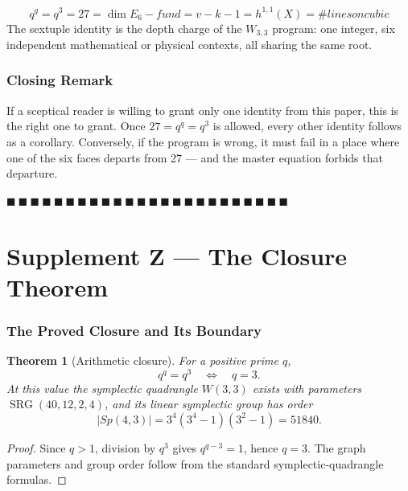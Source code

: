 \documentclass[12pt,a4paper]{article}
\def\mathrm#1{#1}%
\def\text#1{#1}%
\newtheorem{theorem}{Theorem}[section]
\theoremstyle{definition}
\newcommand{\Sp}{\mathrm{Sp}}
\begin{document}
\[
\boxed{\;q^q = q^3 = 27 = \dim E_6\text{-fund} = v - k - 1 = h^{1,1}(X) = \#\text{lines on cubic}\;}
\]
The sextuple identity is the depth charge of the $W_{3,3}$ program:
one integer, six independent mathematical or physical contexts, all
sharing the same root.

\section*{Closing Remark}

If a sceptical reader is willing to grant only one identity from this
paper, this is the right one to grant. Once $27 = q^q = q^3$ is
allowed, every other identity follows as a corollary. Conversely,
if the program is wrong, it must fail in a place where one of the
six faces departs from 27 — and the master equation forbids that
departure.

\hfill $\blacksquare\ \blacksquare\ \blacksquare\ \blacksquare\ \blacksquare\ \blacksquare\ \blacksquare\ \blacksquare\ \blacksquare\ \blacksquare\ \blacksquare\ \blacksquare\ \blacksquare\ \blacksquare\ \blacksquare\ \blacksquare\ \blacksquare\ \blacksquare\ \blacksquare\ \blacksquare\ \blacksquare\ \blacksquare\ \blacksquare\ \blacksquare$

\clearpage
\part*{Supplement Z --- The Closure Theorem}

\section*{The Proved Closure and Its Boundary}

\begin{theorem}[Arithmetic closure]\label{thm:closure}
For a positive prime $q$,
\[
 q^q=q^3\quad\Longleftrightarrow\quad q=3.
\]
At this value the symplectic quadrangle $W(3,3)$ exists with parameters
$\operatorname{SRG}(40,12,2,4)$, and its linear symplectic group has
order
\[
 |\Sp(4,3)|=3^4(3^4-1)(3^2-1)=51840.
\]
\end{theorem}

\begin{proof}
Since $q>1$, division by $q^3$ gives $q^{q-3}=1$, hence $q=3$.
The graph parameters and group order follow from the standard
symplectic-quadrangle formulas.
\end{proof}
\end{document}
